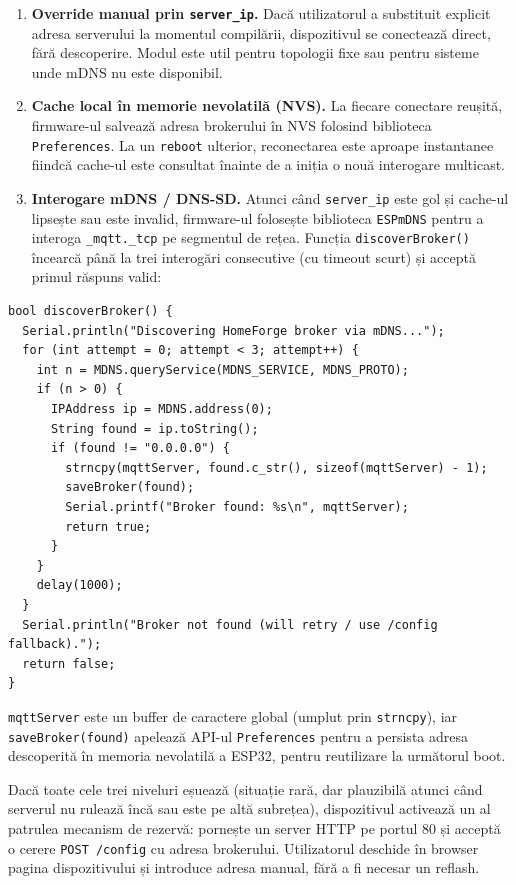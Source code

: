 \begin{enumerate}
    \item \textbf{Override manual prin \texttt{server\_ip}.} Dacă utilizatorul a substituit explicit adresa serverului la momentul compilării, dispozitivul se conectează direct, fără descoperire. Modul este util pentru topologii fixe sau pentru sisteme unde mDNS nu este disponibil.
    \item \textbf{Cache local în memorie nevolatilă (NVS).} La fiecare conectare reușită, firmware-ul salvează adresa brokerului în NVS folosind biblioteca \texttt{Preferences}. La un \texttt{reboot} ulterior, reconectarea este aproape instantanee fiindcă cache-ul este consultat înainte de a iniția o nouă interogare multicast.
    \item \textbf{Interogare mDNS / DNS-SD.} Atunci când \texttt{server\_ip} este gol și cache-ul lipsește sau este invalid, firmware-ul folosește biblioteca \texttt{ESPmDNS} pentru a interoga \texttt{\_mqtt.\_tcp} pe segmentul de rețea. Funcția \texttt{discoverBroker()} încearcă până la trei interogări consecutive (cu timeout scurt) și acceptă primul răspuns valid:
\end{enumerate}

\begin{verbatim}
bool discoverBroker() {
  Serial.println("Discovering HomeForge broker via mDNS...");
  for (int attempt = 0; attempt < 3; attempt++) {
    int n = MDNS.queryService(MDNS_SERVICE, MDNS_PROTO);
    if (n > 0) {
      IPAddress ip = MDNS.address(0);
      String found = ip.toString();
      if (found != "0.0.0.0") {
        strncpy(mqttServer, found.c_str(), sizeof(mqttServer) - 1);
        saveBroker(found);
        Serial.printf("Broker found: %s\n", mqttServer);
        return true;
      }
    }
    delay(1000);
  }
  Serial.println("Broker not found (will retry / use /config fallback).");
  return false;
}
\end{verbatim}
\texttt{mqttServer} este un buffer de caractere global (umplut prin \texttt{strncpy}), iar \texttt{saveBroker(found)} apelează API-ul \texttt{Preferences} pentru a persista adresa descoperită în memoria nevolatilă a ESP32, pentru reutilizare la următorul boot.

Dacă toate cele trei niveluri eșuează (situație rară, dar plauzibilă atunci când serverul nu rulează încă sau este pe altă subrețea), dispozitivul activează un al patrulea mecanism de rezervă: pornește un server HTTP pe portul 80 și acceptă o cerere \texttt{POST /config} cu adresa brokerului. Utilizatorul deschide în browser pagina dispozitivului și introduce adresa manual, fără a fi necesar un reflash.

